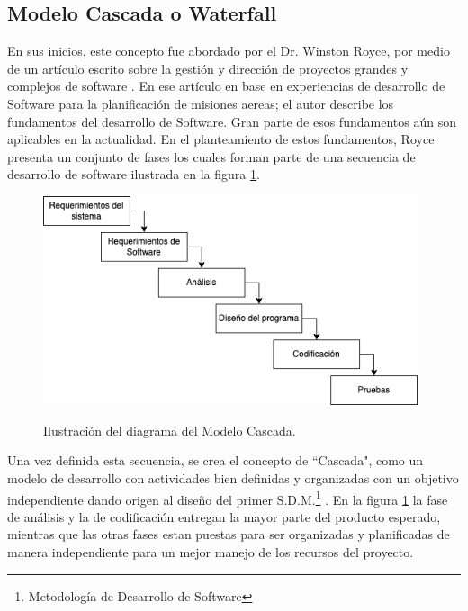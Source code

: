 \subsection{Modelo Cascada o Waterfall}
En sus inicios, este concepto fue abordado por el Dr. Winston Royce, por medio de un artículo escrito sobre la gestión y dirección de proyectos grandes y complejos de software \cite{Winston}. En ese artículo en base en experiencias de desarrollo de Software para la planificación de misiones aereas; el autor describe los fundamentos del desarrollo de Software. Gran parte de esos fundamentos aún son aplicables en la actualidad. En el planteamiento de estos fundamentos, Royce presenta un conjunto de fases los cuales forman parte de una secuencia de desarrollo de software ilustrada en la figura \ref{fig:cascada}.\\

\begin{figure}[H]
    \begin{center}
        \includegraphics[width=11cm]{img/capitulo_2/cascada2.png}
    \end{center}
    \begin{center}
        \caption{Ilustración del diagrama del Modelo Cascada.}
        \label{fig:cascada}
    \end{center}
\end{figure}

Una vez definida esta secuencia, se crea el concepto de ``Cascada", como un modelo de desarrollo con actividades bien definidas y organizadas con un objetivo independiente dando origen al diseño del primer S.D.M.\footnote{Metodología de Desarrollo de Software} \cite{Bell&Thayer}. En la figura \ref{fig:cascada} la fase de análisis y la de codificación entregan la mayor parte del producto esperado, mientras que las otras fases estan puestas para ser organizadas y planificadas de manera independiente para un mejor manejo de los recursos del proyecto.\\

